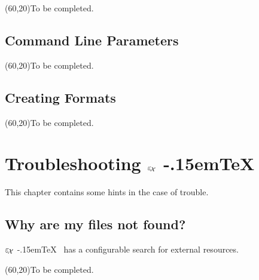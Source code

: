 \documentclass[12pt,div12,a4paper]{scrbook}
\providecommand*{\ExTeX}{\ifx\texorpdfstring\undefined
  \textrm{%
    \ensuremath{\textstyle\varepsilon_{\kern-0.15em\mathcal{X}}}%
    \kern-.15em\TeX}%
  \else\texorpdfstring{%
  \textrm{%
    \ensuremath{\textstyle\varepsilon_{\kern-0.15em\mathcal{X}}}%
    \kern-.15em\TeX
  }}{ExTeX}%
  \fi
}
\newcommand\INCOMPLETE{\bigskip\par{\unitlength=1mm\framebox(60,20){To be completed.}}\bigskip\par}
\begin{document}
\INCOMPLETE

\section{Command Line Parameters}

\INCOMPLETE


\section{Creating Formats}

\INCOMPLETE


\chapter{Troubleshooting \ExTeX}

This chapter contains some hints in the case of trouble.

\section{Why are my files not found?}

\ExTeX\ has a configurable search for external resources.

\INCOMPLETE
\end{document}
